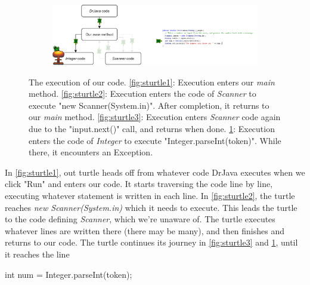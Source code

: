 \begin{figure}[h!]
\begin{subfigure}{1.\textwidth}
  \centering
  \includegraphics[width=1\textwidth]{images/code_turtle_4.png}
  \caption{}
  \label{fig:sturtle4}
\end{subfigure}%

\caption{The execution of our code. \ref{fig:sturtle1}: Execution enters our \textit{main} method. \ref{fig:sturtle2}: Execution enters the code of \textit{Scanner} to execute "new Scanner(System.in)". After completion, it returns to our \textit{main} method. \ref{fig:sturtle3}: Execution enters \textit{Scanner} code again due to the "input.next()" call, and returns when done. \ref{fig:sturtle4}: Execution enters the code of \textit{Integer} to execute "Integer.parseInt(token)". While there, it encounters an Exception.}
\label{fig:turtles}
\end{figure}



In \ref{fig:sturtle1}, out turtle heads off from whatever code DrJava executes when we click "Run" and enters our code. It starts traversing the code line by line, executing whatever statement is written in each line. In \ref{fig:sturtle2}, the turtle reaches \emph{new Scanner(System.in)} which it needs to execute. This leads the turtle to the code defining \emph{Scanner}, which we're unaware of. The turtle executes whatever lines are written there (there may be many), and then finishes and returns to our code. The turtle continues its journey in \ref{fig:sturtle3} and \ref{fig:sturtle4}, until it reaches the line 

\begin{code}
int num = Integer.parseInt(token);
\end{code}



